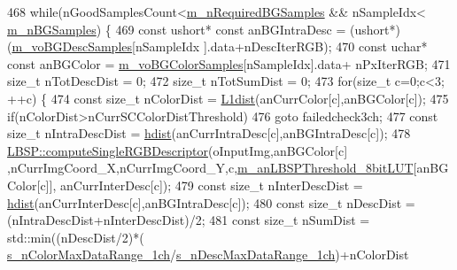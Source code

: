 \begin{DoxyCode}
468             \textcolor{keywordflow}{while}(nGoodSamplesCount<\mbox{\hyperlink{class_background_subtractor_su_b_s_e_n_s_e_aca07c4307021623f9055832506cad1d6}{m\_nRequiredBGSamples}} && nSampleIdx<
      \mbox{\hyperlink{class_background_subtractor_su_b_s_e_n_s_e_ad783b71b5b942c4018d27cf38b7d7225}{m\_nBGSamples}}) \{
469                 \textcolor{keyword}{const} ushort* \textcolor{keyword}{const} anBGIntraDesc = (ushort*)(\mbox{\hyperlink{class_background_subtractor_su_b_s_e_n_s_e_a422cc2f2a25c07efca02087bd6fe3d6d}{m\_voBGDescSamples}}[nSampleIdx
      ].data+nDescIterRGB);
470                 \textcolor{keyword}{const} uchar* \textcolor{keyword}{const} anBGColor = \mbox{\hyperlink{class_background_subtractor_su_b_s_e_n_s_e_a9d4d4bb930b34745536b9862683bb539}{m\_voBGColorSamples}}[nSampleIdx].data+
      nPxIterRGB;
471                 \textcolor{keywordtype}{size\_t} nTotDescDist = 0;
472                 \textcolor{keywordtype}{size\_t} nTotSumDist = 0;
473                 \textcolor{keywordflow}{for}(\textcolor{keywordtype}{size\_t} c=0;c<3; ++c) \{
474                     \textcolor{keyword}{const} \textcolor{keywordtype}{size\_t} nColorDist = \mbox{\hyperlink{_distance_utils_8h_ab6ec458f6d3fb6fb4e6cda3808e61703}{L1dist}}(anCurrColor[c],anBGColor[c]);
475                     \textcolor{keywordflow}{if}(nColorDist>nCurrSCColorDistThreshold)
476                         \textcolor{keywordflow}{goto} failedcheck3ch;
477                     \textcolor{keyword}{const} \textcolor{keywordtype}{size\_t} nIntraDescDist = \mbox{\hyperlink{_distance_utils_8h_ab13812ef6e21af771d6c0a856cd941b0}{hdist}}(anCurrIntraDesc[c],anBGIntraDesc[c]);
478                     \mbox{\hyperlink{class_l_b_s_p_a35f2abfacc0d540810d678ff5e8cd619}{LBSP::computeSingleRGBDescriptor}}(oInputImg,anBGColor[c]
      ,nCurrImgCoord\_X,nCurrImgCoord\_Y,c,\mbox{\hyperlink{class_background_subtractor_l_b_s_p_aefe69d94f08b2c4ba73ad1d254ad9153}{m\_anLBSPThreshold\_8bitLUT}}[anBGColor[c]],
      anCurrInterDesc[c]);
479                     \textcolor{keyword}{const} \textcolor{keywordtype}{size\_t} nInterDescDist = \mbox{\hyperlink{_distance_utils_8h_ab13812ef6e21af771d6c0a856cd941b0}{hdist}}(anCurrInterDesc[c],anBGIntraDesc[c]);
480                     \textcolor{keyword}{const} \textcolor{keywordtype}{size\_t} nDescDist = (nIntraDescDist+nInterDescDist)/2;
481                     \textcolor{keyword}{const} \textcolor{keywordtype}{size\_t} nSumDist = std::min((nDescDist/2)*(
      \mbox{\hyperlink{_background_subtractor_su_b_s_e_n_s_e_8cpp_ad0ce3de05453a1b3738f711d9955031f}{s\_nColorMaxDataRange\_1ch}}/\mbox{\hyperlink{_background_subtractor_su_b_s_e_n_s_e_8cpp_a15305d6ff106cc0ab9f1b7cfb21a27c7}{s\_nDescMaxDataRange\_1ch}})+nColorDist

\end{DoxyCode}
